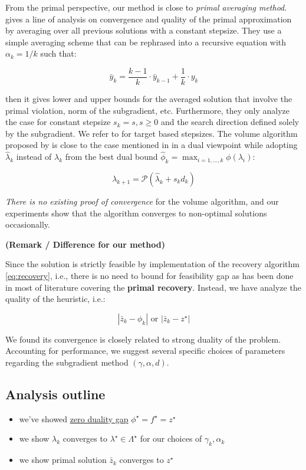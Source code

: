 From the primal perspective, our method is close to \emph{primal
  averaging method}. \cite{nedic_approximate_2009}
gives a line of analysis on convergence and quality of the primal
approximation by averaging over all previous solutions with a constant
stepsize. They use a simple averaging scheme that can be rephrased into a
recursive equation with \(\alpha_k = 1/k\) such that:

\[\bar y_k = \frac{k-1}{k}\cdot\bar y_{k-1} + \frac{1}{k} \cdot y_k\]

then it gives lower and upper bounds for the averaged solution
that involve the primal violation, norm of the subgradient, etc. Furthermore, they only analyze the case for constant
stepsize \(s_k = s, s\ge 0\) and the search direction defined solely by
the subgradient. We refer to \cite{kiwiel_lagrangian_2007} for target based
stepsizes. The volume algorithm proposed by \cite{barahona_volume_2000} is close to the
case mentioned in \cite{brannlund1995generalized} in a dual
viewpoint while adopting \(\hat \lambda_{k}\) instead of \(\lambda_k\) from the best dual bound
\(\hat \phi_k = \max_{i=1, ..., k} \phi(\lambda_i)\):

\[\lambda_{k+1} = \mathcal{P}(\hat\lambda_{k} + s_{k}d_{k})\]

\emph{There is no existing proof of convergence} for the volume
algorithm, and our experiments show that the algorithm converges to
non-optimal solutions occasionally.

\textbf{(Remark / Difference for our method)}

Since the solution is strictly feasible by implementation of the
recovery algorithm \ref{eq:recovery}, i.e., there is no need to bound for feasibility gap
as has been done in most of literature covering the \textbf{primal
  recovery}. Instead, we have analyze the quality of the heuristic, i.e.:

\[
  |\bar z_k - \phi_k| \textrm { or } |\bar z_k - z^\star|
\]

We found its convergence is closely related to strong duality of the problem. Accounting for performance,
we suggest several specific choices of parameters regarding the subgradient method \((\gamma, \alpha, d)\).


\hypertarget{analysis-outline}{%
  \subsection{Analysis outline}\label{analysis-outline}}

\begin{itemize}
  \tightlist
  \item
        we've showed \hyperlink{conditions for strong-duality}{zero duality gap}
        \(\phi^\star = f^\star= z^\star\)
  \item
        we show \(\lambda_k\) converges to \(\lambda^\star \in \Lambda^\star\)
        for our choices of \(\gamma_k, \alpha_k\)
  \item
        we show primal solution \(\bar z_k\) converges to \(z^\star\)
\end{itemize}

